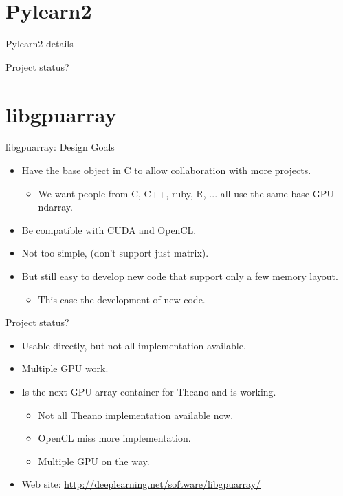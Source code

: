 \documentclass[utf8x,xcolor=pdftex,dvipsnames,table]{beamer}
\begin{document}
\section{Pylearn2}
\begin{frame}{Pylearn2 details}
\end{frame}
\begin{frame}{Project status?}
\end{frame}

\section{libgpuarray}
\begin{frame}{libgpuarray: Design Goals}
  \begin{itemize}
  \item Have the base object in C to allow collaboration with more projects.
    \begin{itemize}
    \item We want people from C, C++, ruby, R, ... all use the same base GPU ndarray.
    \end{itemize}
  \item Be compatible with CUDA and OpenCL.
  \item Not too simple, (don’t support just matrix).
  \item But still easy to develop new code that support only a few memory layout.
    \begin{itemize}
    \item This ease the development of new code.
    \end{itemize}
  \end{itemize}
\end{frame}

\begin{frame}{Project status?}
  \begin{itemize}
  \item Usable directly, but not all implementation available.
  \item Multiple GPU work.
  \item Is the next GPU array container for Theano and is working.
    \begin{itemize}
    \item Not all Theano implementation available now.
    \item OpenCL miss more implementation.
    \item Multiple GPU on the way.
    \end{itemize}
  \item Web site: \url{http://deeplearning.net/software/libgpuarray/}
  \end{itemize}
\end{frame}
\end{document}
